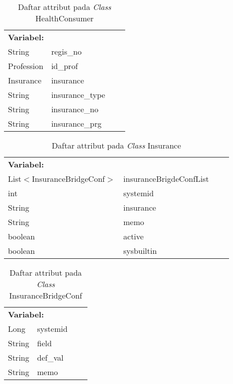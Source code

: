 \begin{table}[H]
	\caption{Daftar attribut pada \textit{Class} HealthConsumer}
	\centering
	\small
	\begin{adjustbox}{width=1\textwidth}	
		\begin{tabular}{|p{4cm} p{2.1cm} p{3cm} p{3.1cm}|}
			\hline
			\multicolumn{2}{|l}{\textbf{Variabel:}}&\multicolumn{2}{l|}{\textbf{}}\\
			String&regis\_no&&\\
			Profession&id\_prof&&\\
			Insurance&insurance&&\\
			String&insurance\_type&&\\
			String&insurance\_no&&\\
			String&insurance\_prg&&\\
			\hline
		\end{tabular}
	\end{adjustbox}
\end{table}
\begin{table}[H]
	\caption{Daftar attribut pada \textit{Class} Insurance}
	\centering
	\small
	\begin{adjustbox}{width=1\textwidth}	
		\begin{tabular}{|p{5cm} p{3.1cm} p{2cm} p{2.1cm}|}
			\hline
			\multicolumn{2}{|l}{\textbf{Variabel:}}&\multicolumn{2}{l|}{\textbf{}}\\
			List$<$InsuranceBridgeConf$>$&insuranceBrigdeConfList&&\\
			int&systemid&&\\
			String&insurance&&\\
			String&memo&&\\
			boolean&active&&\\
			boolean&sysbuiltin&&\\
			\hline
		\end{tabular}
	\end{adjustbox}
\end{table}
\begin{table}[H]
	\caption{Daftar attribut pada \textit{Class} InsuranceBridgeConf}
	\centering
	\small
	\begin{adjustbox}{width=1\textwidth}	
		\begin{tabular}{|p{5cm} p{3.1cm} p{2cm} p{2.1cm}|}
			\hline
			\multicolumn{2}{|l}{\textbf{Variabel:}}&\multicolumn{2}{l|}{\textbf{}}\\
			Long&systemid&&\\
			String&field&&\\
			String&def\_val&&\\
			String&memo&&\\
			\hline
		\end{tabular}
	\end{adjustbox}
\end{table}

